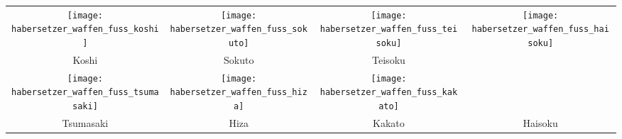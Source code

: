 	\null\vfill\null	
	\begin{tabularx}{\textwidth}{cccc}
	\texttt{[image: habersetzer\_waffen\_fuss\_koshi]} 		& \texttt{[image: habersetzer\_waffen\_fuss\_sokuto]} 		& \texttt{[image: habersetzer\_waffen\_fuss\_teisoku]} &
	\multirow{3}{*}{\texttt{[image: habersetzer\_waffen\_fuss\_haisoku]}}
	\\
	Koshi 		& Sokuto 	& Teisoku &\\
	\texttt{[image: habersetzer\_waffen\_fuss\_tsumasaki]} 	& \texttt{[image: habersetzer\_waffen\_fuss\_hiza]} 		&  \texttt{[image: habersetzer\_waffen\_fuss\_kakato]} &\\
	Tsumasaki 	& Hiza 		& Kakato & Haisoku\\
	\end{tabularx}
	\null\vfill\null